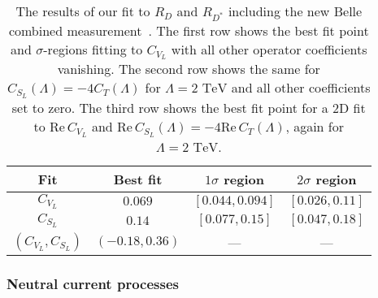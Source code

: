 \begin{table}[t]
    \centering
    \begin{tabular}{c|ccc}
      \toprule
      Fit & Best fit & $1\sigma$ region & $2\sigma$ region \\
      \midrule
      $C_{V_L}$  & $0.069$ & $[0.044, 0.094]$ & $[0.026, 0.11]$ \\
      $C_{S_L}$ & $0.14$ & $[0.077, 0.15]$ & $[0.047, 0.18]$ \\
      $(C_{V_L}, C_{S_L})$ & $(-0.18, 0.36)$ & --- & --- \\
      \bottomrule
    \end{tabular}
    \caption{The results of our fit to $R_D$ and $R_{D^*}$ including the new
      Belle combined measurement~\cite{Abdesselam:2019dgh}. The first row shows
      the best fit point and $\sigma$-regions fitting to $C_{V_L}$ with all
      other operator coefficients vanishing. The second row shows the same for
      $C_{S_L}(\Lambda) = -4 C_T(\Lambda)$ for $\Lambda = 2 \text{ TeV}$ and all
      other coefficients set to zero. The third row shows the best fit point for
      a 2D fit to $\text{Re}\, C_{V_L}$ and
      $\text{Re}\, C_{S_L}(\Lambda)= -4 \text{Re}\, C_T(\Lambda)$, again for
      $\Lambda = 2 \text{ TeV}$.}
    \label{tab:fitresults}
\end{table}

\subsubsection{Neutral current processes}
\label{sec:ch3-neutralcurrentprocesses}

